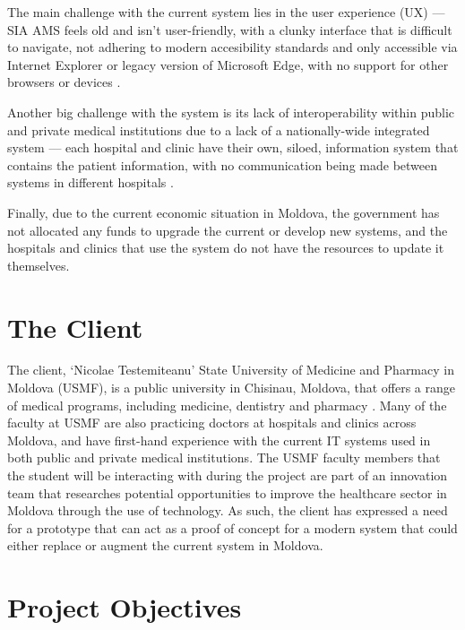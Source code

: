 The main challenge with the current system lies in the user experience (UX) --- SIA AMS feels old and isn't user-friendly, with a clunky interface that is difficult to navigate, not adhering to modern accesibility standards and only accessible via Internet Explorer or legacy version of Microsoft Edge, with no support for other browsers or devices \parencite{mdehr}. 

Another big challenge with the system is its lack of interoperability within public and private medical institutions due to a lack of a nationally-wide integrated system --- each hospital and clinic have their own, siloed, information system that contains the patient information, with no communication being made between systems in different hospitals \parencite{mdehr}. 

Finally, due to the current economic situation in Moldova, the government has not allocated any funds to upgrade the current or develop new systems, and the hospitals and clinics that use the system do not have the resources to update it themselves.

\section{The Client}

The client, `Nicolae Testemiteanu' State University of Medicine and Pharmacy in Moldova (USMF), is a public university in Chisinau, Moldova, that offers a range of medical programs, including medicine, dentistry and pharmacy \parencite{mduni}. Many of the faculty at USMF are also practicing doctors at hospitals and clinics across Moldova, and have first-hand experience with the current IT systems used in both public and private medical institutions. The USMF faculty members that the student will be interacting with during the project are part of an innovation team that researches potential opportunities to improve the healthcare sector in Moldova through the use of technology. As such, the client has expressed a need for a prototype that can act as a proof of concept for a modern system that could either replace or augment the current system in Moldova.

\section{Project Objectives}

